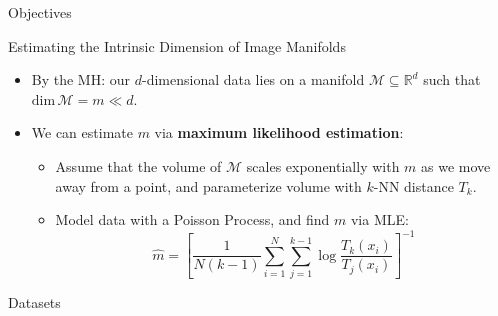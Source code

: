 \documentclass[final,hyperref={pdfpagelabels=false}]{beamer}
\begin{document}
\begin{frame}[t]
\begin{columns}[t]
\begin{column}{.47\textwidth}
\begin{block}{Objectives}
\end{block}

\begin{block}{Estimating the Intrinsic Dimension of Image Manifolds}
\begin{itemize}
    \item By the MH: our $d$-dimensional data lies on a manifold $\mathcal{M}\subseteq \mathbb{R}^d$ such that $\mathrm{dim}\,{\mathcal{M}}=m\ll d$.
\item We can estimate $m$ via \textbf{maximum likelihood estimation}:
    \begin{itemize}
        \item Assume that the volume of $\mathcal{M}$ scales exponentially with $m$ as we move away from a point, and parameterize volume with $k$-NN distance $T_k$.
        \item Model data with a Poisson Process, and find $m$ via MLE:
        \begin{equation*}
            \label{eq:id_mle}
                \hat{m}=\left[\frac{1}{N(k-1)} \sum_{i=1}^{N} \sum_{j=1}^{k-1} \log \frac{T_{k}\left(x_{i}\right)}{T_{j}\left(x_{i}\right)}\right]^{-1}
        \end{equation*}
    \end{itemize}

\end{itemize}
\end{block}

\begin{block}{Datasets}


\end{block}
\end{column}
\end{columns}
\end{frame}
\end{document}
